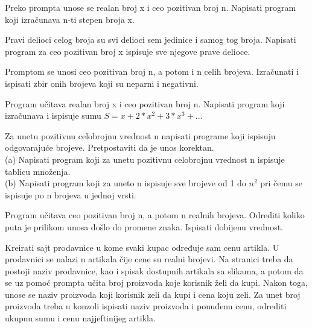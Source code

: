 \begin{primer}
Preko prompta unose se realan broj x i ceo pozitivan
broj n. Napisati program koji izračunava n-ti stepen broja x.
\end{primer}

\begin{primer}
Pravi delioci celog broja su svi delioci sem jedinice i samog
tog broja. Napisati program za ceo pozitivan broj x ispisuje sve njegove
prave delioce.
\end{primer}

\begin{primer}
Promptom se unosi ceo pozitivan broj n, a potom i n celih
brojeva. Izračunati i ispisati zbir onih brojeva koji su neparni i negativni.
\end{primer}

\begin{primer}
Program učitava realan broj x i ceo pozitivan broj n.
Napisati program koji izračunava i ispisuje sumu $S=x + 2*x^2 + 3*x^3 + ..$.
\end{primer}

\begin{primer}
Za unetu pozitivnu celobrojnu vrednost n napisati programe
koji ispisuju odgovarajuće brojeve. Pretpostaviti da je unos korektan.\\
(a) Napisati program koji za unetu pozitivnu celobrojnu vrednost n ispisuje
tablicu množenja.\\
(b) Napisati program koji za uneto n ispisuje sve brojeve od 1 do $n^2$ pri čemu se ispisuje po n brojeva u jednoj vrsti.\\
\end{primer}

\begin{primer}
Program učitava ceo pozitivan broj n, a potom n realnih
brojeva. Odrediti koliko puta je prilikom unosa došlo do promene znaka. Ispisati
dobijenu vrednost.
\end{primer}

\begin{primer}
Kreirati sajt prodavnice u kome svaki kupac određuje sam cenu artikla. U prodavnici se nalazi n artikala čije cene su realni brojevi. Na stranici treba da postoji naziv prodavnice, kao i spisak dostupnih artikala sa slikama, a potom da se uz pomoć prompta učita broj proizvoda koje korisnik želi da kupi. Nakon toga, unose se naziv proizvoda koji korisnik zeli da kupi i cena koju zeli. Za unet broj proizvoda treba u konzoli ispisati naziv proizvoda i ponuđenu cenu, odrediti ukupnu sumu i cenu najjeftinijeg artikla.
\end{primer}

